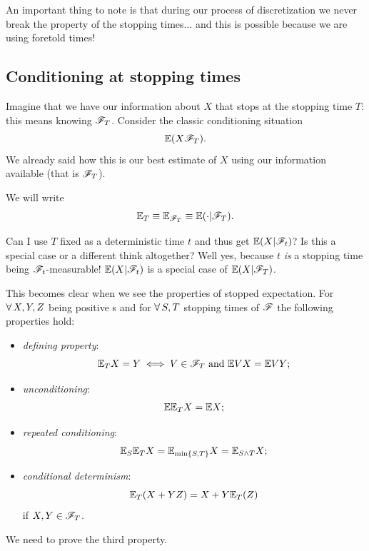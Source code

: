 \documentclass{report}
\begin{document}
An important thing to note is that during our process of discretization we never break the property of the stopping times... and this is possible because we are using foretold times!
\subsection{Conditioning at stopping times}
Imagine that we have our information about $X$ that stops at the stopping time $T$: this means knowing $\mathscr{F}_T$. Consider the classic conditioning situation
\[\mathbb{E}(X\mathscr{F}_T).\]
We already said how this is our best estimate of $X$ using our information available (that is $\mathscr{F}_T$).
\begin{notation}
	We will write
	\[\mathbb{E}_T\equiv\mathbb{E}_{\mathscr{F}_T}\equiv\mathbb{E}(\cdot|\mathscr{F}_T).\]
\end{notation}
\begin{remark}
	Can I use $T$ fixed as a deterministic time $t$ and thus get $\mathbb{E}(X|\mathscr{F}_t)$? Is this a special case or a different think altogether? Well yes, because $t$ \textit{is} a stopping time being $\mathscr{F}_t$-measurable! $\mathbb{E}(X|\mathscr{F}_t)$ is a special case of $\mathbb{E}(X|\mathscr{F}_T)$.
\end{remark}
This becomes clear when we see the properties of stopped expectation. For $\forall\, X,Y,Z$ being positive \rv s and for $\forall\, S,T$ stopping times of $\mathscr{F}$ the following properties hold:
\begin{itemize}
	\item \emph{defining property}:
	\[\mathbb{E}_T X=Y\iff V\in\mathscr{F}_T\text{ and }\mathbb{E} VX=\mathbb{E} VY;\]
	\item \emph{unconditioning}:
	\[\mathbb{E}\mathbb{E}_T X=\mathbb{E} X;\]
	\item \emph{repeated conditioning}:
	\[\mathbb{E}_S\mathbb{E}_T X=\mathbb{E}_{\min\{S,T\}}X=\mathbb{E}_{S\wedge T}X;\]
	\item \emph{conditional determinism}:
	\[\mathbb{E}_T(X+YZ)=X+Y\mathbb{E}_T(Z)\]
	if $X,Y\in\mathscr{F}_T$.
\end{itemize}
We need to prove the third property.
\end{document}
